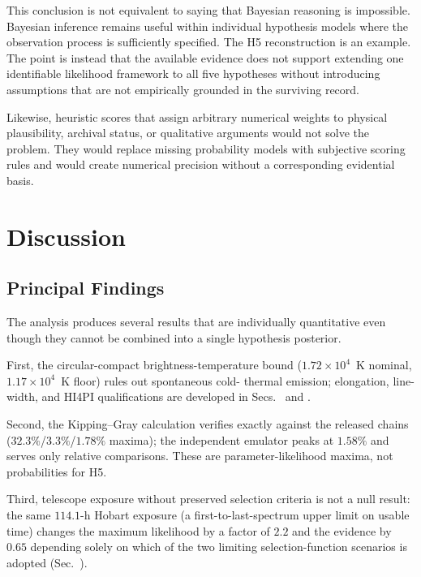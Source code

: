 \documentclass[twocolumn]{aastex701}
\begin{document}
This conclusion is not equivalent to saying that Bayesian reasoning is impossible. Bayesian inference remains useful within individual hypothesis models where the observation process is sufficiently specified. The H5 reconstruction is an example. The point is instead that the available evidence does not support extending one identifiable likelihood framework to all five hypotheses without introducing assumptions that are not empirically grounded in the surviving record.

Likewise, heuristic scores that assign arbitrary numerical weights to physical plausibility, archival status, or qualitative arguments would not solve the problem. They would replace missing probability models with subjective scoring rules and would create numerical precision without a corresponding evidential basis.


\section{Discussion}
\label{sec:discussion}

\subsection{Principal Findings}

The analysis produces several results that are individually quantitative even though they cannot be combined into a single hypothesis posterior.

First, the circular-compact brightness-temperature bound ($1.72\times10^4$~K nominal, $1.17\times10^4$~K floor) rules out spontaneous cold- thermal emission; elongation, line-width, and HI4PI qualifications are developed in Secs.~ and .

Second, the Kipping--Gray calculation verifies exactly against the released chains ($32.3\%$/$3.3\%$/$1.78\%$ maxima); the independent emulator peaks at $1.58\%$ and serves only relative comparisons. These are parameter-likelihood maxima, not probabilities for H5.

Third, telescope exposure without preserved selection criteria is not a null result: the same $114.1$-h Hobart exposure (a first-to-last-spectrum upper limit on usable time) changes the maximum likelihood by a factor of $2.2$ and the evidence by $0.65$ depending solely on which of the two limiting selection-function scenarios is adopted (Sec.~).
\end{document}
